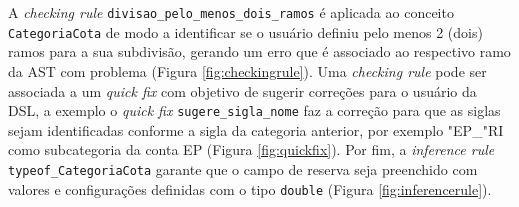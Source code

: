 

\newpage
A \textit{checking rule} \texttt{divisao\_pelo\_menos\_dois\_ramos} é aplicada ao conceito \texttt{CategoriaCota} de modo a identificar se o usuário definiu pelo menos 2 (dois) ramos para a sua subdivisão, gerando um erro que é associado ao respectivo ramo da AST com problema (Figura \ref{fig:checkingrule}). Uma \textit{checking rule} pode ser associada a um \textit{quick fix} com objetivo de sugerir correções para o usuário da \gls{DSL}, a exemplo o \textit{quick fix} \texttt{sugere\_sigla\_nome} faz a correção para que as siglas sejam identificadas conforme a sigla da categoria anterior, por exemplo "EP\_"RI como subcategoria da conta EP (Figura \ref{fig:quickfix}). Por fim, a \textit{inference rule} \texttt{typeof\_CategoriaCota} garante que o campo de reserva seja preenchido com valores e configurações definidas com o tipo \texttt{double} (Figura \ref{fig:inferencerule}).